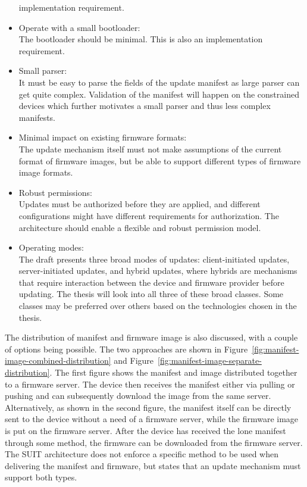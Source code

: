 \documentclass[0-thesis.tex]{subfiles}
\begin{document}
\begin{itemize}
            implementation requirement. 
    \item Operate with a small bootloader:\\
            The bootloader should be minimal. This is also an implementation requirement. 
    \item Small parser:\\
            It must be easy to parse the fields of the update manifest as large parser can
            get quite complex. Validation of the manifest will happen on the constrained
            devices which further motivates a small parser and thus less complex
            manifests.
    \item Minimal impact on existing firmware formats:\\
            The update mechanism itself must not make assumptions of the current format of
            firmware images, but be able to support different types of firmware image
            formats.
    \item Robust permissions:\\
            Updates must be authorized before they are applied, and different
            configurations might have different requirements for authorization. The
            architecture should enable a flexible and robust permission model.
    \item Operating modes:\\
            The draft presents three broad modes of updates: client-initiated updates,
            server-initiated updates, and hybrid updates, where hybrids are mechanisms
            that require interaction between the device and firmware provider before
            updating. The thesis will look into all three of these broad classes. Some
            classes may be preferred over others based on the technologies chosen in the
            thesis.
\end{itemize}

The distribution of manifest and firmware image is also discussed, with a couple of
options being possible. The two approaches are shown in
Figure~\ref{fig:manifest-image-combined-distribution} and
Figure~\ref{fig:manifest-image-separate-distribution}. The first figure shows the manifest
and image distributed together to a firmware server. The device then receives the manifest
either via pulling or pushing and can subsequently download the image from the same
server. Alternatively, as shown in the second figure, the manifest itself can be directly
sent to the device without a need of a firmware server, while the firmware image is put on
the firmware server. After the device has received the lone manifest through some method,
the firmware can be downloaded from the firmware server. The SUIT architecture does not
enforce a specific method to be used when delivering the manifest and firmware, but states
that an update mechanism must support both types.
\end{document}

